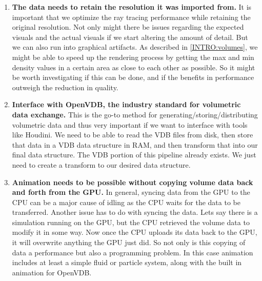 \begin{enumerate}
    \item \textbf{The data needs to retain the resolution it was imported from.} It is important that we optimize the ray tracing performance while retaining the original resolution. Not only might there be issues regarding the expected visuals and the actual visuals if we start altering the amount of detail. But we can also run into graphical artifacts. 
    As described in \ref{INTRO:volumes}, we might be able to speed up the rendering process by getting the max and min density values in a certain area as close to each other as possible. So it might be worth investigating if this can be done, and if the benefits in performance outweigh the reduction in quality. \label{FR:resolution}
    \item \textbf{Interface with OpenVDB\cite{museth2013vdb}, the industry standard for volumetric data exchange.} This is the go-to method for generating/storing/distributing volumetric data and thus very important if we want to interface with tools like Houdini\cite{Houdini}. We need to be able to read the VDB files from disk, then store that data in a VDB data structure in RAM, and then transform that into our final data structure. The VDB portion of this pipeline already exists. We just need to create a transform to our desired data structure. \label{FR:interfacing}
    \item \textbf{Animation needs to be possible without copying volume data back and forth from the GPU.} In general, syncing data from the GPU to the CPU can be a major cause of idling as the CPU waits for the data to be transferred. Another issue has to do with syncing the data. Lets say there is a simulation running on the GPU, but the CPU retrieved the volume data to modify it in some way. Now once the CPU uploads its data back to the GPU, it will overwrite anything the GPU just did. So not only is this copying of data a performance but also a programming problem. In this case animation includes at least a simple fluid or particle system, along with the built in animation for OpenVDB. \label{FR:animation}
\end{enumerate}





